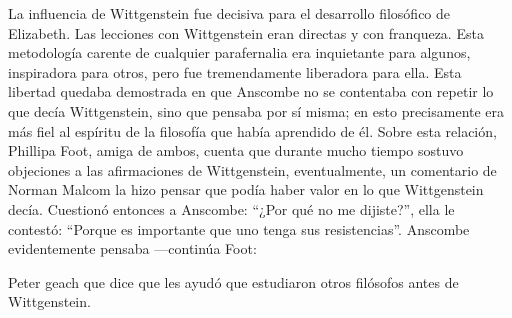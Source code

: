      La influencia de Wittgenstein fue decisiva para el desarrollo filosófico de
     Elizabeth. Las lecciones con Wittgenstein eran directas y con franqueza. Esta
     metodología carente de cualquier parafernalia era inquietante para algunos,
     inspiradora para otros, pero fue tremendamente liberadora para
     ella.\autocite[loc 9853 Chapter 4, Section 24, \S5]{monk} Esta libertad
     quedaba demostrada en que Anscombe no se contentaba con repetir lo que decía
     Wittgenstein, sino que pensaba por sí misma; en esto precisamente era más fiel
     al espíritu de la filosofía que había aprendido de él. Sobre esta relación,
     Phillipa Foot, amiga de ambos, cuenta que durante mucho tiempo sostuvo
     objeciones a las afirmaciones de Wittgenstein, eventualmente, un comentario de
     Norman Malcom la hizo pensar que podía haber valor en lo que Wittgenstein decía.
     Cuestionó entonces a Anscombe:
     ``¿Por qué no me dijiste?'', ella le contestó: ``Porque es importante que uno
     tenga sus resistencias''. Anscombe evidentemente pensaba ---continúa Foot:

     Peter geach que dice que les ayudó que estudiaron otros filósofos antes de
     Wittgenstein.


